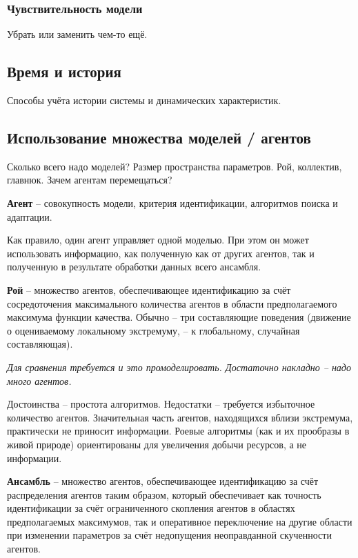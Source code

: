 \documentclass[a4paper,12pt]{article}
\begin{document}
\subsubsection{Чувствительность модели}

Убрать или заменить чем-то ещё.


\subsection{Время и история}

Способы учёта истории системы и динамических характеристик.

\subsection{ Использование множества моделей / агентов}

Сколько всего надо моделей? Размер пространства параметров.
Рой, коллектив, главнюк.
Зачем агентам перемещаться?

\textbf{ Агент } -- совокупность модели, критерия идентификации,
алгоритмов поиска и адаптации.

Как правило, один агент управляет одной моделью. При этом
он может использовать информацию, как полученную как от других
агентов, так и полученную в результате обработки данных
всего ансамбля.

\textbf{ Рой } -- множество агентов, обеспечивающее идентификацию за счёт
сосредоточения максимального количества агентов
в области предполагаемого максимума функции качества.
Обычно -- три составляющие поведения
(движение о оцениваемому локальному экстремуму, -- к глобальному, случайная составляющая).

\textit{Для сравнения требуется и это промоделировать.
Достаточно накладно -- надо много агентов.}

Достоинства -- простота алгоритмов.
Недостатки -- требуется избыточное количество агентов.
Значительная часть агентов, находящихся вблизи экстремума,
практически не приносит информации. Роевые
алгоритмы (как и их прообразы в живой природе) ориентированы
для увеличения добычи ресурсов, а не информации.

\textbf{ Ансамбль } -- множество агентов, обеспечивающее идентификацию за счёт
распределения агентов таким образом, который обеспечивает как
точность идентификации за счёт ограниченного скопления агентов
в областях предполагаемых максимумов, так и оперативное переключение
на другие области при изменении параметров за счёт недопущения
неоправданной скученности агентов.
\end{document}
